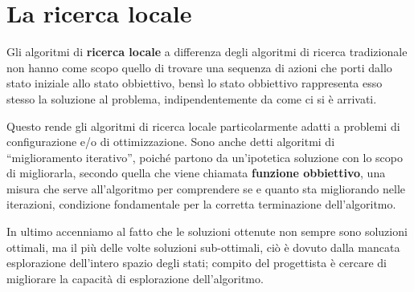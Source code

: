 \documentclass[a4paper, 11pt, oneside]{report}
\begin{document}
        \chapter{La ricerca locale}
        Gli algoritmi di \textbf{ricerca locale} a differenza degli algoritmi di ricerca tradizionale non hanno come scopo
        quello di trovare una sequenza di azioni che porti dallo stato iniziale allo stato obbiettivo, bensì lo stato
        obbiettivo rappresenta esso stesso la soluzione al problema, indipendentemente da come ci si è arrivati.
        \par \noindent Questo rende gli algoritmi di ricerca locale particolarmente adatti a problemi di configurazione
        e/o di ottimizzazione. Sono anche detti algoritmi di ``miglioramento iterativo'', poiché partono da un'ipotetica
        soluzione con lo scopo di migliorarla, secondo quella che viene chiamata \textbf{funzione obbiettivo}, una misura
        che serve all'algoritmo per comprendere se e quanto sta migliorando nelle iterazioni, condizione fondamentale per
        la corretta terminazione dell'algoritmo.
        \par \noindent In ultimo accenniamo al fatto che le soluzioni ottenute non sempre sono soluzioni ottimali, ma il
        più delle volte soluzioni sub-ottimali, ciò è dovuto dalla mancata esplorazione dell'intero spazio degli stati;
        compito del progettista è cercare di migliorare la capacità di esplorazione dell'algoritmo.
\end{document}
